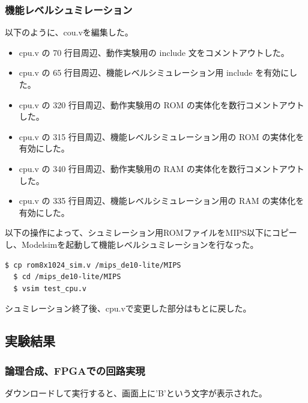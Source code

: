 \subsubsection{機能レベルシュミレーション}
以下のように、cou.vを編集した。
\begin{itemize}
  \item cpu.v の 70 行目周辺、動作実験用の include 文をコメントアウトした。
  \item cpu.v の 65 行目周辺、機能レベルシミュレーション用 include を有効にした。
  \item cpu.v の 320 行目周辺、動作実験用の ROM の実体化を数行コメントアウトした。
  \item cpu.v の 315 行目周辺、機能レベルシミュレーション用の ROM の実体化を有効にした。
  \item cpu.v の 340 行目周辺、動作実験用の RAM の実体化を数行コメントアウトした。
  \item cpu.v の 335 行目周辺、機能レベルシミュレーション用の RAM の実体化を有効にした。
\end{itemize}

以下の操作によって、シュミレーション用ROMファイルをMIPS以下にコピーし、Modelsimを起動して機能レベルシュミレーションを行なった。

\begin{lstlisting}[caption={機能レベルシュミレーション},label={機能レベルシュミレーション1－2}]
  $ cp rom8x1024_sim.v /mips_de10-lite/MIPS
  $ cd /mips_de10-lite/MIPS
  $ vsim test_cpu.v
\end{lstlisting}

シュミレーション終了後、cpu.vで変更した部分はもとに戻した。

\subsection{実験結果}
\subsubsection{論理合成、FPGAでの回路実現}
ダウンロードして実行すると、画面上に'B'という文字が表示された。

